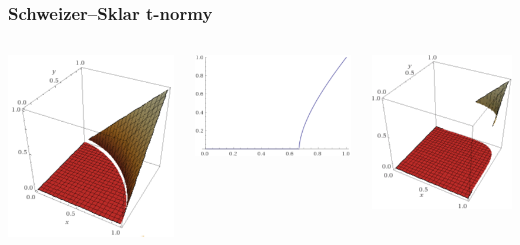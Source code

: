 \documentclass{beamer}
\begin{document}
\begin{frame}
\frametitle{Schweizer–Sklar t-normy}
\begin{columns}
\begin{minipage}[c][0.4\textheight][c]{\linewidth}
  \centering
  \includegraphics[width=0.5\linewidth]{SS1-7}
\end{minipage}
\begin{minipage}[c][0.4\textheight][c]{\linewidth}
  \centering
  \includegraphics[width=0.7\linewidth]{SS1_7-diag}
\end{minipage}
\begin{minipage}[c][0.4\textheight][c]{\linewidth}
  \centering
  \includegraphics[width=0.5\linewidth]{SS7}

\end{minipage}
\end{columns}
\end{frame}
\end{document}
